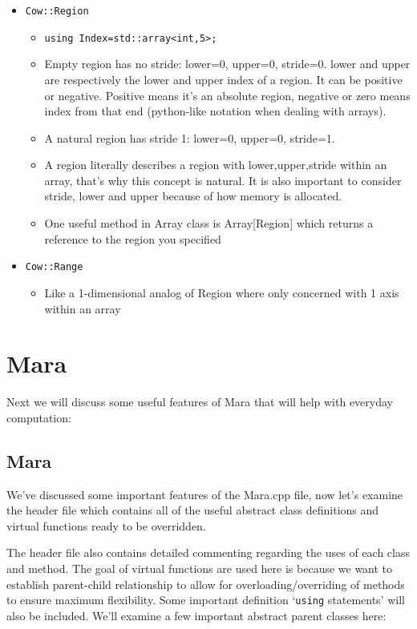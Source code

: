 \documentclass{article}
\begin{document}
\begin{itemize}
\begin{itemize}
	\end{itemize}
	\item \texttt{Cow::Region}
	\begin{itemize}
		\item \texttt{using Index=std::array<int,5>;}
		\item Empty region has no stride: lower=0, upper=0, stride=0. lower and upper are respectively the lower and upper index of a region. It can be positive or negative. Positive means it's an absolute region, negative or zero means index from that end (python-like notation when dealing with arrays). 
		\item A natural region has stride 1: lower=0, upper=0, stride=1.
		\item A region literally describes a region with lower,upper,stride within an array, that's why this concept is natural. It is also important to consider stride, lower and upper because of how memory is allocated. 
		\item One useful method in Array class is Array[Region] which returns a reference to the region you specified
	\end{itemize}
	\item \texttt{Cow::Range}
	\begin{itemize}
		\item Like a 1-dimensional analog of Region where only concerned with 1 axis within an array

	\end{itemize}
\end{itemize}

\section{Mara}
Next we will discuss some useful features of Mara that will help with everyday computation:

\subsection{Mara}
We've discussed some important features of the Mara.cpp file, now let's examine the header file which contains all of the useful abstract class definitions and virtual functions ready to be overridden. 

The header file also contains detailed commenting regarding the uses of each class and method. The goal of virtual functions are used here is because we want to establish parent-child relationship to allow for overloading/overriding of methods to ensure maximum flexibility. Some important definition `\texttt{using} statements' will also be included. We'll examine a few important abstract parent classes here:
\end{document}
